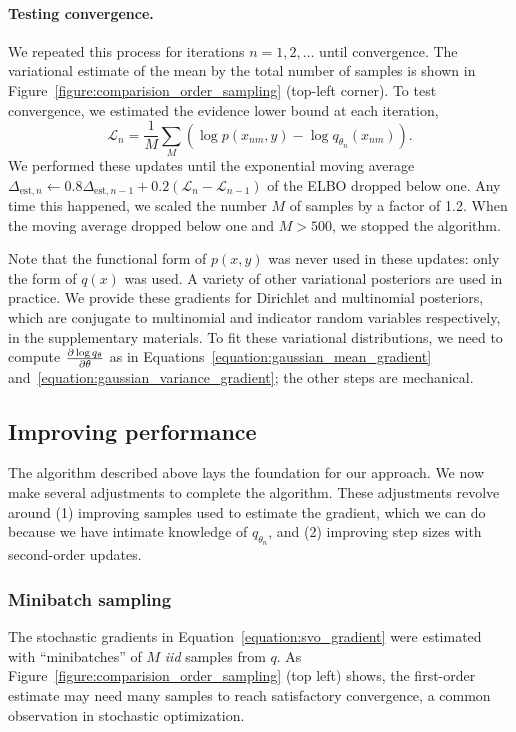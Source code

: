 \paragraph{Testing convergence.}
We repeated this process for iterations $n = 1, 2, \ldots$ until
convergence.  The variational estimate of the mean by the total number of
samples is shown in Figure~\ref{figure:comparision_order_sampling}
(top-left corner).  To test convergence, we estimated the evidence
lower bound at each iteration,
\[
  \mathcal{L}_n = \frac{1}{M} \sum_M \left( \log p(x_{nm}, y) - \log
q_{\theta_n}(x_{nm}) \right).
\]
We performed these updates until the exponential moving average
$\Delta_{\mbox{est},n} \gets 0.8 \Delta_{\mbox{est},{n-1}} + 0.2
(\mathcal{L}_n - \mathcal{L}_{n-1})$ of the ELBO dropped below one.
Any time this happened, we scaled the number $M$ of samples by a
factor of 1.2. When the moving average dropped below one and $M >
500$, we stopped the algorithm.

Note that the functional form of $p(x, y)$ was never used in these
updates: only the form of $q(x)$ was used.  A variety of other
variational posteriors are used in practice.  We provide these
gradients for Dirichlet and multinomial posteriors, which are
conjugate to multinomial and indicator random variables respectively,
in the supplementary materials. To fit these variational
distributions, we need to compute $\frac{\partial \log q_\theta}{\partial \theta}$ as
in Equations~\ref{equation:gaussian_mean_gradient}
and~\ref{equation:gaussian_variance_gradient}; the other steps are
mechanical.

\subsection{Improving performance}

The algorithm described above lays the foundation for our approach.  We
now make several adjustments to complete the algorithm.  These
adjustments revolve around (1) improving samples used to estimate the
gradient, which we can do because we have intimate knowledge of
$q_{\theta_n}$, and (2) improving step sizes with second-order updates.

\subsubsection{Minibatch sampling}
\label{section:minibatch_sampling}
The stochastic gradients in Equation~\ref{equation:svo_gradient} were
estimated with ``minibatches'' of $M$ \emph{iid} samples from $q$.  As
Figure~\ref{figure:comparision_order_sampling} (top left) shows, the
first-order estimate may need many samples to reach satisfactory
convergence, a common observation in stochastic optimization.

